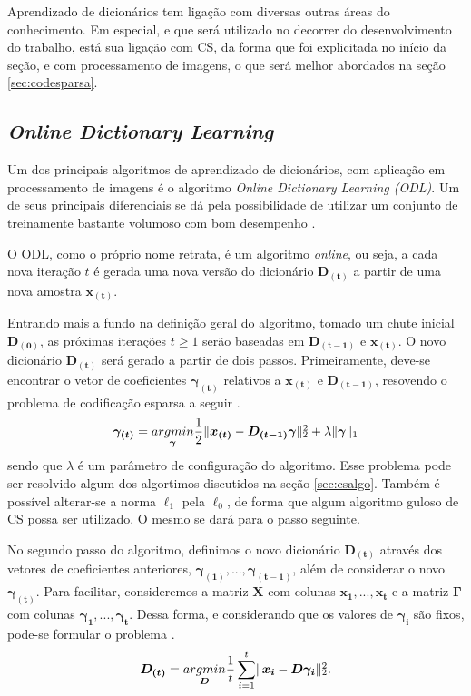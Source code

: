 \documentclass[cic,tc]{iiufrgs}
\def\SPSB#1#2{\rlap{\textsuperscript{#1}}\SB{#2}}
\def\SB#1{\textsubscript{#1}}
\renewcommand{\vec}[1]{\bm{#1}}
\newcommand{\mat}[1]{\bm{#1}}
\begin{document}
Aprendizado de dicionários tem ligação com diversas outras áreas do conhecimento. 
Em especial, e que será utilizado no decorrer do desenvolvimento do trabalho, está sua ligação
com CS, da forma que foi explicitada no início da seção, e com processamento de imagens,
o que será melhor abordados na seção \ref{sec:codesparsa}.

\subsection{\textit{Online Dictionary Learning}}
\label{sec:odl}
Um dos principais algoritmos de aprendizado de dicionários, com aplicação em processamento de imagens
é o algoritmo \textit{Online Dictionary Learning (ODL)}. Um de seus principais diferenciais
se dá pela possibilidade de utilizar um conjunto de treinamente bastante volumoso com bom 
desempenho \cite{MairalOnlineDictLearn}.

O ODL, como o próprio nome retrata, é um algoritmo \textit{online}, ou seja, a cada nova iteração $t$
é gerada uma nova versão do dicionário $\mat{D_{(t)}}$ a partir de uma nova amostra $\vec{x_{(t)}}$.

Entrando mais a fundo na definição geral do algoritmo, tomado um chute inicial $\mat{D_{(0)}}$, as próximas
iterações $t \ge 1$ serão baseadas em $\mat{D_{(t-1)}}$ e $\vec{x_{(t)}}$. O novo dicionário $\mat{D_{(t)}}$ será
gerado a partir de dois passos. Primeiramente, deve-se encontrar o vetor de coeficientes $\vec{\gamma_{(t)}}$
relativos a $\vec{x_{(t)}}$ e $\mat{D_{(t-1)}}$, resovendo o problema de codificação esparsa a seguir \cite{chen2015compressed}.
\begin{equation}
    \vec{\gamma_{(t)}} = \underset{\vec{\gamma}}{argmin}
    \frac{1}{2} \lVert \vec{x_{(t)}} - \mat{D_{(t-1)}}\vec{\gamma} \rVert\SPSB{2}{2} +
    \lambda \lVert \vec{\gamma} \rVert_1
\end{equation}
sendo que $\lambda$ é um parâmetro de configuração do algoritmo. Esse problema pode ser resolvido algum dos 
algortimos discutidos na seção \ref{sec:csalgo}. Também é possível alterar-se a norma $\ell_1$ pela $\ell_0$,
de forma que algum algoritmo guloso de CS possa ser utilizado. O mesmo se dará para o passo seguinte.

No segundo passo do algoritmo, definimos o novo dicionário $\mat{D_{(t)}}$ através dos vetores de coeficientes
anteriores, $\vec{\gamma_{(1)}}, ..., \vec{\gamma_{(t-1)}}$, além de considerar o novo $\vec{\gamma_{(t)}}$.
Para facilitar, consideremos a matriz $\mat{X}$ com colunas $\vec{x_1},...,\vec{x_t}$ e a matriz $\mat{\Gamma}$
com colunas $\vec{\gamma_1},...,\vec{\gamma_t}$.
Dessa forma, e considerando que os valores de $\vec{\gamma_i}$ são fixos, pode-se formular o problema \cite{chen2015compressed}.
\begin{equation}
    \mat{D_{(t)}} = \underset{\mat{D}}{argmin}
    \frac{1}{t} \sum_{i=1}^t \lVert \vec{x_i} - \mat{D}\vec{\gamma_i} \rVert\SPSB{2}{2}.
\end{equation}
\end{document}
